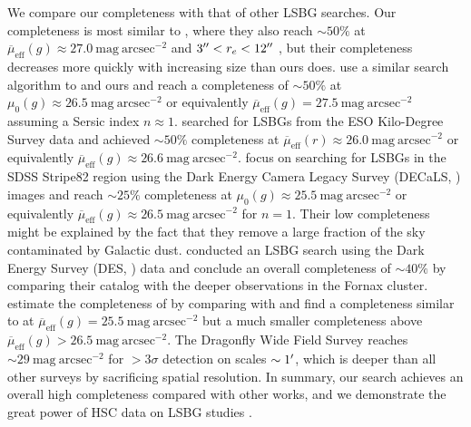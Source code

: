 \documentclass[twocolumn,astrosymb,twocolappendix]{aastex631}
\newcommand{\sbunit}{\mathrm{mag\ arcsec}^{-2}}
\newcommand{\sbeff}{\overline{\mu}_{\mathrm{eff}}(g)}
\newcommand{\sbeffr}{\overline{\mu}_{\mathrm{eff}}(r)}
\begin{document}
\begin{CJK*}{UTF8}{gbsn}
We compare our completeness with that of other LSBG searches. Our completeness is most similar to , where they also reach $\sim 50\%$ at $\sbeff \approx 27.0\ \sbunit$ and $3\mbox{$^{\prime\prime}$} < r_e < 12\mbox{$^{\prime\prime}$}$ \citep{Kado-Fong2021,Greene2022}, but their completeness decreases more quickly with increasing size than ours does. \citet{CarlstenELVES2022} use a similar search algorithm to  and ours and reach a completeness of $\sim 50\%$ at $\mu_0(g)\approx 26.5\ \sbunit$ or equivalently $\sbeff = 27.5\ \sbunit$ assuming a Sersic index $n \approx 1$. \citet{vdBurg2017} searched for LSBGs from the ESO Kilo-Degree Survey data and achieved $\sim 50\%$ completeness at $\sbeffr\approx 26.0\ \sbunit$ or equivalently $\sbeff \approx 26.6\ \sbunit$. \citet{Zaritsky2021} focus on searching for LSBGs in the SDSS Stripe82 region using the Dark Energy Camera Legacy Survey (DECaLS, \citealt{Dey2019}) images and reach $\sim 25\%$ completeness at $\mu_{0}(g) \approx 25.5\ \sbunit$ or equivalently $\sbeff \approx 26.5\ \sbunit$ for $n=1$. Their low completeness might be explained by the fact that they remove a large fraction of the sky contaminated by Galactic dust. \citet{Tanoglidis2021} conducted an LSBG search using the Dark Energy Survey (DES, \citealt{Abbot2018}) data and conclude an overall completeness of $\sim 40\%$ by comparing their catalog with the deeper observations in the Fornax cluster. \citet{Kado-Fong2021} estimate the completeness of \citet{Tanoglidis2021} by comparing with  and find a completeness similar to  at $\sbeff = 25.5\ \sbunit$ but a much smaller completeness above $\sbeff > 26.5\ \sbunit$. The Dragonfly Wide Field Survey \citep{Danieli2020} reaches $\sim 29\ \sbunit$ for $>3\sigma$ detection on scales $\sim 1\mbox{$^\prime$}$, which is deeper than all other surveys by sacrificing spatial resolution. In summary, our search achieves an overall high completeness compared with other works, and we demonstrate the great power of HSC data on LSBG studies \citep[e.g.,][]{Huang2018,Kado-Fong2018}. 


\end{CJK*}
\end{document}
